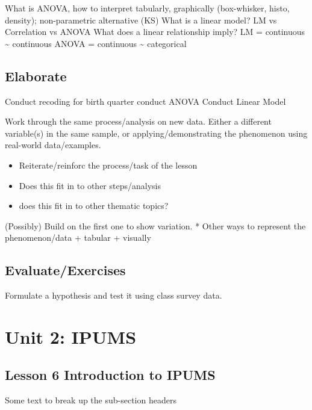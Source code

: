 \documentclass[
]{book}
\providecommand{\tightlist}{%
  \setlength{\itemsep}{0pt}\setlength{\parskip}{0pt}}
\begin{document}
What is ANOVA, how to interpret tabularly, graphically (box-whisker, histo, density); non-parametric alternative (KS)
What is a linear model? LM vs Correlation vs ANOVA
What does a linear relationship imply?
LM = continuous \textasciitilde{} continuous
ANOVA = continuous \textasciitilde{} categorical

\hypertarget{elaborate-4}{%
\section{Elaborate}\label{elaborate-4}}

Conduct recoding for birth quarter
conduct ANOVA
Conduct Linear Model

Work through the same process/analysis on new data. Either a different
variable(s) in the same sample, or applying/demonstrating the phenomenon
using real-world data/examples.

\begin{itemize}
\tightlist
\item
  Reiterate/reinforc the process/task of the lesson
\item
  Does this fit in to other steps/analysis
\item
  does this fit in to other thematic topics?
\end{itemize}

(Possibly) Build on the first one to show variation.
* Other ways to represent the phenomenon/data
+ tabular
+ visually

\hypertarget{evaluateexercises-4}{%
\section{Evaluate/Exercises}\label{evaluateexercises-4}}

Formulate a hypothesis and test it using class survey data.

\hypertarget{unit-2-ipums}{%
\chapter*{Unit 2: IPUMS}\label{unit-2-ipums}}

\hypertarget{lesson-6-introduction-to-ipums}{%
\section*{Lesson 6 Introduction to IPUMS}\label{lesson-6-introduction-to-ipums}}

Some text to break up the sub-section headers
\end{document}
